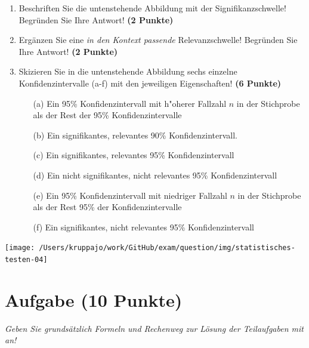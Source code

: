 \documentclass[a4paper, 9pt]{scrartcl}\usepackage[]{graphicx}\usepackage[]{xcolor}
\begin{document}
\begin{enumerate}
\item Beschriften Sie die untenstehende Abbildung mit der Signifikanzschwelle! Begründen Sie Ihre Antwort! \textbf{(2 Punkte)}
\item Ergänzen Sie eine \textit{in den Kontext passende} Relevanzschwelle! Begründen Sie Ihre Antwort! \textbf{(2 Punkte)} 
\item Skizieren Sie in die untenstehende Abbildung sechs einzelne Konfidenzintervalle (a-f) mit den
  jeweiligen Eigenschaften! \textbf{(6 Punkte)}
  \begin{itemize}
  \item[(a)] Ein 95\% Konfidenzintervall mit h{"o}herer Fallzahl $n$ in der Stichprobe als der Rest der 95\% Konfidenzintervalle 	
  \item[(b)] Ein signifikantes, relevantes 90\% Konfidenzintervall. 	
  \item[(c)] Ein signifikantes, relevantes 95\% Konfidenzintervall 	
  \item[(d)] Ein nicht signifikantes, nicht relevantes 95\% Konfidenzintervall 
  \item[(e)] Ein 95\% Konfidenzintervall mit niedriger Fallzahl $n$ in der Stichprobe als der Rest 95\% der Konfidenzintervalle
  \item[(f)] Ein signifikantes, nicht relevantes 95\% Konfidenzintervall
  \end{itemize}
\end{enumerate}

\begin{center}
  \texttt{[image: /Users/kruppajo/work/GitHub/exam/question/img/statistisches-testen-04]}
\end{center}


 
\clearpage

\section{Aufgabe \hfill (10 Punkte)}

\textit{Geben Sie grundsätzlich Formeln und Rechenweg zur Lösung der Teilaufgaben mit an!} \\[1Ex]
\end{document}
